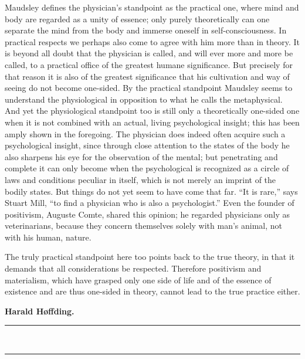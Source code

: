 \documentclass[12pt,a4paper,openany]{book}
\newcommand{\opage}[1]{\marginnote{\footnotesize\textit{[#1]}}}
\begin{document}
Maudsley defines the physician's standpoint as the practical one,
where mind and body are regarded as a unity of essence;
only purely theoretically can one separate the mind from the body and
immerse oneself in self-consciousness. In practical respects we
perhaps also come to agree with him more than in theory.
It is beyond all doubt that the physician is called, and will ever
more and more be called, to a practical office of the
greatest humane significance. But precisely for that reason it is also
of the greatest significance that his cultivation and way of seeing
do not become one-sided. By the practical standpoint
Maudsley seems to understand the physiological in opposition to what
he calls the metaphysical. And yet the physiological
standpoint too is still only a theoretically one-sided one when it is not
\opage{333}combined with an actual, living psychological insight; this
has been amply shown in the foregoing. The physician does indeed often
acquire such a psychological insight, since through close
attention to the states of the body he also sharpens
his eye for the observation of the mental; but penetrating
and complete it can only become when the psychological
is recognized as a circle of laws and conditions peculiar in itself,
which is not merely an imprint of the bodily states.
But things do not yet seem to have come that far. ``It
is rare,'' says Stuart Mill, ``to find a physician who is also
a psychologist.'' Even the founder of positivism, Auguste
Comte, shared this opinion; he regarded physicians only
as veterinarians, because they concern themselves solely with man's
animal, not with his human, nature.

The truly practical standpoint here too points
back to the true theory, in that it demands that all considerations be
respected. Therefore positivism and materialism,
which have grasped only one side of life and of the essence
of existence and are thus one-sided in theory, cannot lead to
the true practice either.

\begin{flushright}\textbf{Harald Høffding.}\end{flushright}
\begin{center}\rule{2.2cm}{0.4pt}\\[-10pt]\rule{2.2cm}{0.4pt}\end{center}
\end{document}
